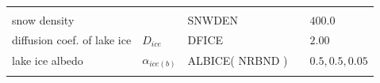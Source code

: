 \begin{longtable}[]{@{}lllll@{}}
\begin{minipage}[t]{0.37\columnwidth}
\end{minipage}\tabularnewline
\begin{minipage}[t]{0.19\columnwidth}\raggedright
snow density\strut
\end{minipage} & \begin{minipage}[t]{0.15\columnwidth}\raggedright
\strut
\end{minipage} & \begin{minipage}[t]{0.11\columnwidth}\raggedright
SNWDEN\strut
\end{minipage} & \begin{minipage}[t]{0.04\columnwidth}\raggedright
\strut
\end{minipage} & \begin{minipage}[t]{0.37\columnwidth}\raggedright
\(400.0\)\strut
\end{minipage}\tabularnewline
\begin{minipage}[t]{0.19\columnwidth}\raggedright
diffusion coef. of lake ice\strut
\end{minipage} & \begin{minipage}[t]{0.15\columnwidth}\raggedright
\(D_{ice}\)\strut
\end{minipage} & \begin{minipage}[t]{0.11\columnwidth}\raggedright
DFICE\strut
\end{minipage} & \begin{minipage}[t]{0.04\columnwidth}\raggedright
\strut
\end{minipage} & \begin{minipage}[t]{0.37\columnwidth}\raggedright
\(2.00\)\strut
\end{minipage}\tabularnewline
\begin{minipage}[t]{0.19\columnwidth}\raggedright
lake ice albedo\strut
\end{minipage} & \begin{minipage}[t]{0.15\columnwidth}\raggedright
\(\alpha_{ice(b)}\)\strut
\end{minipage} & \begin{minipage}[t]{0.11\columnwidth}\raggedright
ALBICE( NRBND )\strut
\end{minipage} & \begin{minipage}[t]{0.04\columnwidth}\raggedright
\strut
\end{minipage} & \begin{minipage}[t]{0.37\columnwidth}\raggedright
\(0.5, 0.5, 0.05\)\strut
\end{minipage}\tabularnewline
\begin{minipage}[t]{0.19\columnwidth}\raggedright

\end{minipage}
\end{longtable}
